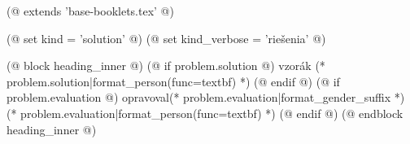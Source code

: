 (@ extends 'base-booklets.tex' @)

(@ set kind = 'solution' @)
(@ set kind_verbose = 'riešenia' @)

(@ block heading_inner @)
    (@ if problem.solution @)%
        vzorák (* problem.solution|format_person(func=textbf) *)%
    (@ endif @)%
    (@ if problem.evaluation @)%
        opravoval(* problem.evaluation|format_gender_suffix *) (* problem.evaluation|format_person(func=textbf) *)%
    (@ endif @)%
(@ endblock heading_inner @)
